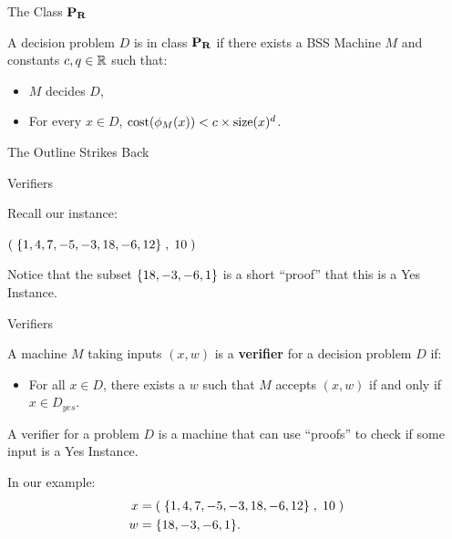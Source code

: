 \documentclass[c]{beamer}
\begin{document}
\begin{frame}{The Class $\mathbf{P_R}$}
  
  A decision problem $D$ is in class $\mathbf{P_R}$ if there exists a BSS
  Machine $M$ and constants $c, q \in \mathbb{R}$ such that:
  \begin{itemize}
  \item $M$ decides $D$,
  \item For every $x \in D$, $\text{cost}(\phi_M(x)) < c \times \text{size}(x)^d$.
  \end{itemize}
  
\end{frame}

\begin{frame}{The Outline Strikes Back}
  \begin{center}
    \scaletopagewidth{\outlinefinal}
  \end{center}
\end{frame}

\begin{frame}{Verifiers}

  Recall our \subsum{} instance:

  \vspace{\baselineskip}

  $(\;\{1,4,7,-5,-3,18,-6,12\}\;, \;10\;)$

  \vspace{\baselineskip}

  Notice that the subset $\{18, -3, -6, 1\}$ is a short ``proof''
  that this is a Yes Instance.

  \vspace{\baselineskip}

\end{frame}

\begin{frame}{Verifiers}

  A machine $M$ taking inputs $(x, w)$ is a \textbf{verifier} for a decision
  problem $D$ if:

  \begin{itemize}
  \item[] For all $x \in D$, there exists a $w$ such that $M$ accepts
    $(x, w)$ if and only if $x \in D_{yes}$.
  \end{itemize}\pause

  A verifier for a problem $D$ is a machine that can use ``proofs'' to
  check if some input is a Yes Instance.\pause

  \vspace{\baselineskip}

  In our example: 
  \begin{align*}
    x &= (\;\{1,4,7,-5,-3,18,-6,12\}\;, \;10\;) \\
    w &= \{18, -3, -6,1\}.
  \end{align*}
\end{frame}
\end{document}
